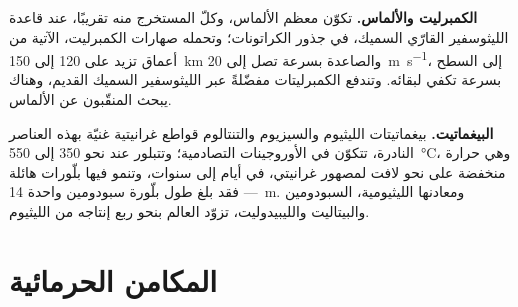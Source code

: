\textbf{الكمبرليت والألماس.} تكوّن معظم الألماس، وكلّ المستخرج منه تقريبًا، عند قاعدة
الليثوسفير القارّي السميك، في جذور الكراتونات؛ وتحمله صهارات الكمبرليت، الآتية من أعماق
تزيد على 120 إلى \qty{150}{km} والصاعدة بسرعة تصل إلى \qty{20}{m.s^{-1}}، إلى
السطح بسرعة تكفي لبقائه. وتندفع الكمبرليتات مفضّلةً عبر الليثوسفير السميك القديم،
وهناك يبحث المنقّبون عن الألماس.

\textbf{البيغماتيت.} بيغماتيتات الليثيوم والسيزيوم والتنتالوم قواطع غرانيتية غنيّة بهذه العناصر
النادرة، تتكوّن في الأوروجينات التصادمية؛ وتتبلور عند نحو 350 إلى \qty{550}{\celsius}،
وهي حرارة منخفضة على نحو لافت لمصهور غرانيتي، في أيام إلى سنوات، وتنمو فيها بلّورات هائلة --- فقد بلغ طول
بلّورة سبودومين واحدة \qty{14}{m}. ومعادنها الليثيومية، السبودومين والبيتاليت
والليبيدوليت، تزوّد العالم بنحو ربع إنتاجه من الليثيوم.

\section{المكامن الحرمائية}\label{sec:b2:ore-deposits:hydrothermal}


